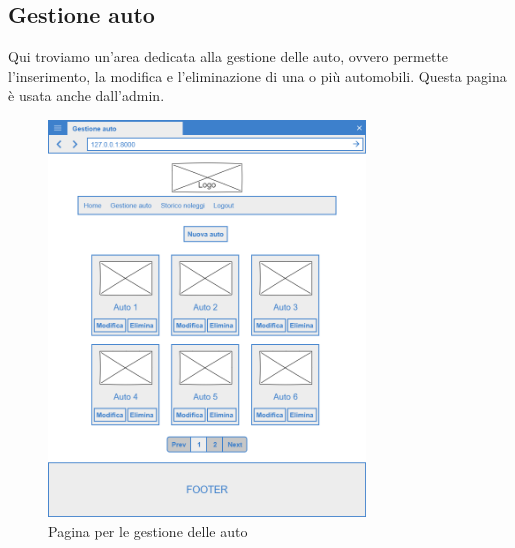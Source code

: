 \documentclass[12pt,a4paperS]{report}
\begin{document}
\begin{normalsize}
			\subsection{Gestione auto}
				Qui troviamo un'area dedicata alla gestione delle auto, ovvero permette l'inserimento, la modifica e l'eliminazione di una o più automobili.
				\newline
				Questa pagina è usata anche dall'admin.
				\begin{figure}[H]
					\centering
					\includegraphics[width=0.75\textwidth, height=0.75\textheight, keepaspectratio]{Mockup/Gestione_auto.png}
					\caption{Pagina per le gestione delle auto}
				\end{figure}
			

\end{normalsize}
\end{document}

